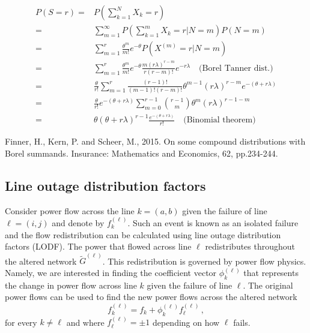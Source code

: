 \documentclass{article}
\renewcommand{\l}{\ell}
\begin{document}
\[\begin{aligned}
P(S=r) =& P\left( \sum_{k=1}^{N}  X_k=r \right)\\
=& \sum_{m=1}^{\infty} P\left(\sum_{k=1}^{m} X_k=r|N=m \right)P(N=m)\\
=& \sum_{m=1}^{r} \frac{\theta^m}{m!}e^{-\theta} P(X^{(m)} = r|N=m)\\
=& \sum_{m=1}^{r} \frac{\theta^m}{m!}e^{-\theta} \frac{m(r\lambda)^{r-m}}{r(r-m)!}e^{-r\lambda} \quad \text{(Borel Tanner dist.)}\\
=& \frac{\theta}{r!} \sum_{m=1}^{r} \frac{(r-1)!}{(m-1)!(r-m)!} \theta^{m-1}(r\lambda)^{r-m}e^{-(\theta+r\lambda)}\\
=& \frac{\theta}{r!}e^{-(\theta+r\lambda)} \sum_{m=0}^{r-1} {r-1\choose m} \theta^m (r\lambda)^{r-1-m}\\
=& \theta(\theta + r\lambda)^{r-1} \frac{e^{-(\theta+r\lambda)}}{r!} \quad \text{(Binomial theorem)}
\end{aligned}\]

Finner, H., Kern, P. and Scheer, M., 2015. On some compound distributions with Borel summands. Insurance: Mathematics and Economics, 62, pp.234-244.

\subsection{Line outage distribution factors}

Consider power flow across the line $k=(a,b)$ given the failure of line $\l=(i,j)$ and denote by $f_k^{(\l)}$. Such an event is known as an isolated failure and the flow redistribution can be calculated using line outage distribution factors (LODF). The power that flowed across line $\l$ redistributes throughout the altered network $\tilde G^{(\l)}$. This redistribution is governed by power flow physics. Namely, we are interested in finding the coefficient vector $\phi_k^{(\l)}$ that represents the change in power flow across line $k$ given the failure of line $\l$. The original power flows can be used to find the new power flows across the altered network 
\[f_k^{(\l)} = f_k + \phi_k^{(\l)}f_\l^{(\l)}\,,\]
for every $k\ne \l$ and where $f_\l^{(\l)} = \pm 1$ depending on how $\l$ fails. 
\end{document}
